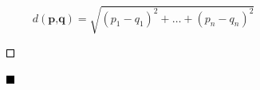 \documentclass{report}
\begin{document}
\[d(\textbf{p,q}) = \sqrt{(p_1 - q_1)^2 + \dots + (p_n - q_n)^2} \]

\begin{figure}[H]
	\centering
	\begin{subfigure}[b]{0.2\textwidth}
		\includegraphics[width=\textwidth]{images/mostlywhite.png}
	\end{subfigure}\hfill
	\begin{subfigure}[b]{0.2\textwidth}
		\includegraphics[width=\textwidth]{images/allblack.png}

\end{subfigure}
\end{figure}
\end{document}
